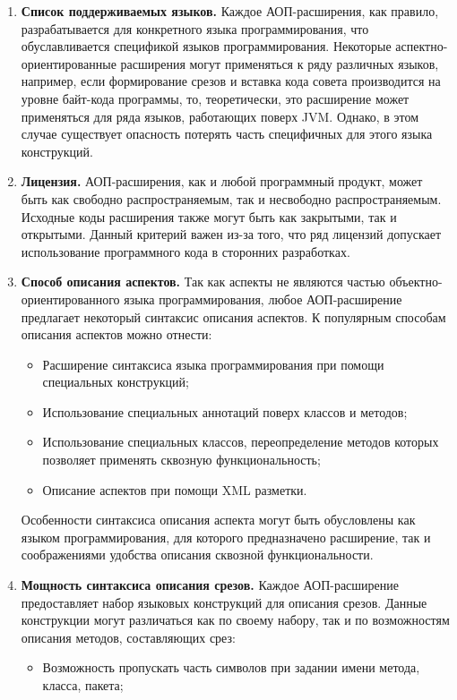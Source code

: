 \begin{enumerate}
\item \textbf{Список поддерживаемых языков.}
  Каждое АОП-расширения, как правило, разрабатывается для конкретного языка
  программирования, что обуславливается спецификой языков программирования.
  Некоторые аспектно-ориентированные расширения могут применяться
  к ряду различных языков, например, если формирование срезов и вставка кода
  совета производится на уровне байт-кода программы, то, теоретически, это
  расширение может применяться для ряда языков, работающих поверх JVM.
  Однако, в этом случае существует опасность потерять часть специфичных для
  этого языка конструкций.
\item \textbf{Лицензия.}
  АОП-расширения, как и любой программный продукт, может быть как свободно
  распространяемым, так и несвободно распространяемым.
  Исходные коды расширения также могут быть как закрытыми, так и открытыми.
  Данный критерий важен из-за того, что ряд лицензий допускает использование
  программного кода в сторонних разработках.
\item \textbf{Способ описания аспектов.}
  Так как аспекты не являются частью объектно-ориентированного языка
  программирования, любое АОП-расширение предлагает некоторый синтаксис описания аспектов.
  К популярным способам описания аспектов можно отнести:
  \begin{itemize}
      \item Расширение синтаксиса языка программирования при помощи специальных конструкций;
      \item Использование специальных аннотаций поверх классов и методов;
      \item Использование специальных классов, переопределение методов которых позволяет применять сквозную функциональность;
      \item Описание аспектов при помощи XML разметки.
  \end{itemize}
  Особенности синтаксиса описания аспекта могут быть обусловлены как языком
  программирования, для которого предназначено расширение, так и соображениями
  удобства описания сквозной функциональности.
\item \textbf{Мощность синтаксиса описания срезов.}
  Каждое АОП-расширение предоставляет набор языковых конструкций для описания срезов.
  Данные конструкции могут различаться как по своему набору, так и по возможностям описания методов, составляющих срез:
  \begin{itemize}
      \item Возможность пропускать часть символов при задании имени метода, класса, пакета;

\end{itemize}
\end{enumerate}
